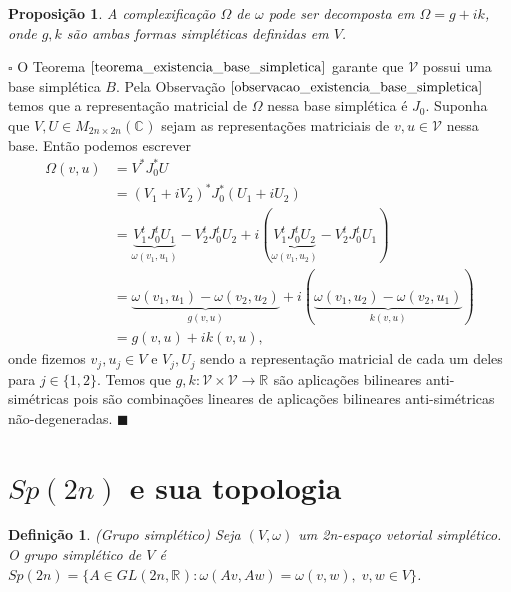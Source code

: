 \documentclass[12pt]{book}
\newtheorem{definicao}[teorema]{Definição}
\newtheorem{proposicao}[teorema]{Proposição}
\newenvironment{prova}[1]{$\square$ #1}{\hfill$\blacksquare$}
\newcommand{\complexificacaotensorialabrev}[1]{\mathcal{V}}
\newcommand{\complexo}[1]{\mathbb{C}^{#1}}
\newcommand{\estruturacomplexa}{J_{0}}
\newcommand{\formaSimpletica}[2]{\omega(#1, #2)}
\newcommand{\formaSimpleticaExtendida}[2]{\Omega(#1, #2)}
\newcommand{\generalgroup}[2]{GL(#1, #2)}
\newcommand{\generalgroupreal}[1]{\generalgroup{#1}{\real{}}}
\newcommand{\gruposimpletico}[1]{Sp(#1)}
\newcommand{\matrizquadcomplexa}[1]{M_{#1 \times #1}(\complexo{})}
\newcommand{\real}[1]{\mathbb{R}^{#1}}
\newcommand{\reta}{\real{}}
\begin{document}
	\begin{proposicao}
		A complexificação $\Omega$ de $\omega$ pode ser decomposta em $\Omega = g +i k$, onde $g,k$ são ambas formas simpléticas definidas em $V$.
	\end{proposicao}
	\begin{prova}
		
		O Teorema $\ref{teorema_existencia_base_simpletica}$ garante que $\complexificacaotensorialabrev{V}$ possui uma base simplética $B$. Pela Observação $\ref{observacao_existencia_base_simpletica}$ temos que a representação matricial de $\Omega$ nessa base simplética é $\estruturacomplexa$. Suponha que $V, U \in \matrizquadcomplexa{2n}$ sejam as representações matriciais de $v,u \in \complexificacaotensorialabrev{V}$ nessa base. Então podemos escrever $$
		\begin{aligned}
		\formaSimpleticaExtendida{v}{u} &= V^{*}\estruturacomplexa^{*} U 
		\\
		&= (V_{1}+iV_{2})^{*}\estruturacomplexa^{*} (U_{1}+iU_{2})
		\\
		&= \underbrace{V_{1}^{t}\estruturacomplexa^{t} U_{1}}_{\formaSimpletica{v_{1}}{u_{1}}} -V_{2}^{t}\estruturacomplexa^{t} U_{2}+i(\underbrace{ V_{1}^{t}\estruturacomplexa^{t} U_{2}}_{\formaSimpletica{v_{1}}{u_{2}}} - V_{2}^{t}\estruturacomplexa^{t} U_{1})
		\\
		&= \underbrace{\formaSimpletica{v_{1}}{u_{1}} -\formaSimpletica{v_{2}}{u_{2}}}_{g(v,u)}+i(\underbrace{ \formaSimpletica{v_{1}}{u_{2}}- \formaSimpletica{v_{2}}{u_{1}}}_{k(v,u)})
		\\
		&= g(v,u)+ik(v,u),
		\end{aligned}
		$$
		onde fizemos $v_{j}, u_{j}\in V$ e $V_{j}, U_{j}$ sendo a representação matricial de cada um deles para $j \in \{1,2\}$.
		Temos que $g,k:\complexificacaotensorialabrev{V}\times \complexificacaotensorialabrev{V} \to \reta$ são aplicações bilineares anti-simétricas pois são combinações lineares de aplicações bilineares anti-simétricas não-degeneradas.
	\end{prova}
	\section{$\gruposimpletico{2n}$ e sua topologia}
	
	\begin{definicao}
		(Grupo simplético) Seja $(V,\omega)$ um 2n-espaço vetorial simplético. O grupo simplético de $V$ é $\gruposimpletico{2n} = \{A \in \generalgroupreal{2n}: \omega(Av, Aw) = \omega(v, w), \; v,w \in V \}$.
	\end{definicao}
	
\end{document}
